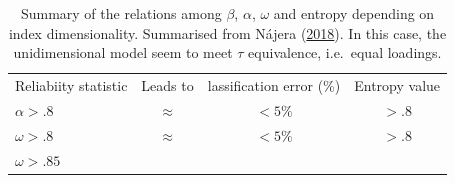 \documentclass[]{book}
\begin{document}
\begin{longtable}[]{@{}lccc@{}}
\caption{\label{tab:relentropy} Summary of the relations among
\(\beta\), \(\alpha\), \(\omega\) and entropy depending on index
dimensionality. Summarised from Nájera (\protect\hyperlink{ref-Najera2018}{2018}).
In this case, the unidimensional model seem to meet
\(\tau\) equivalence, i.e.~equal loadings.}\tabularnewline
\toprule
\endhead
\begin{minipage}[t]{0.21\columnwidth}\raggedright
Reliabiity
statistic\strut
\end{minipage} & \begin{minipage}[t]{0.15\columnwidth}\centering
Leads to\strut
\end{minipage} & \begin{minipage}[t]{0.28\columnwidth}\centering
lassification error
(\%)\strut
\end{minipage} & \begin{minipage}[t]{0.12\columnwidth}\centering
Entropy
value\strut
\end{minipage}\tabularnewline
\begin{minipage}[t]{0.21\columnwidth}\raggedright
\(\alpha>.8\)\strut
\end{minipage} & \begin{minipage}[t]{0.15\columnwidth}\centering
\(\approx\)\strut
\end{minipage} & \begin{minipage}[t]{0.28\columnwidth}\centering
\(<5\%\)\strut
\end{minipage} & \begin{minipage}[t]{0.12\columnwidth}\centering
\(>.8\)\strut
\end{minipage}\tabularnewline
\begin{minipage}[t]{0.21\columnwidth}\raggedright
\(\omega>.8\)\strut
\end{minipage} & \begin{minipage}[t]{0.15\columnwidth}\centering
\(\approx\)\strut
\end{minipage} & \begin{minipage}[t]{0.28\columnwidth}\centering
\(<5\%\)\strut
\end{minipage} & \begin{minipage}[t]{0.12\columnwidth}\centering
\(>.8\)\strut
\end{minipage}\tabularnewline
\begin{minipage}[t]{0.21\columnwidth}\raggedright
\(\omega>.85\)\strut
\end{minipage} & \begin{minipage}[t]{0.15\columnwidth}\centering

\end{minipage}
\end{longtable}
\end{document}

